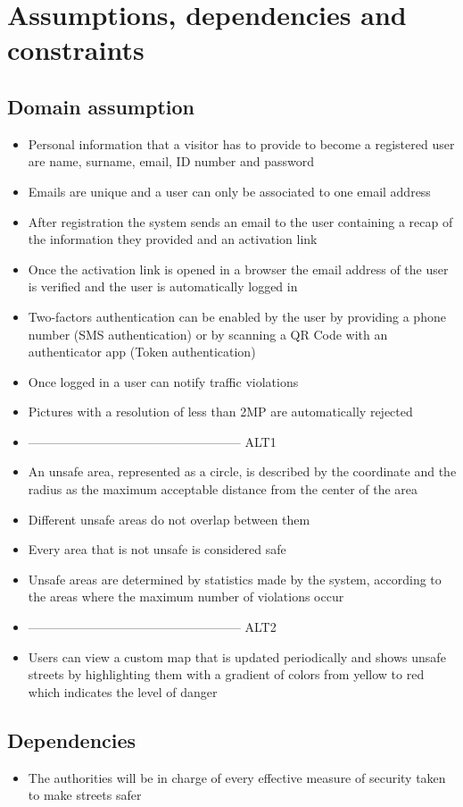 \section{Assumptions, dependencies and constraints}

\subsection{Domain assumption}
  \begin{itemize}
    \item Personal information that a visitor has to provide to become a registered user are name, surname, email, ID number and password
    \item Emails are unique and a user can only be associated to one email address
    \item After registration the system sends an email to the user containing a recap of the information they provided and an activation link
    \item Once the activation link is opened in a browser the email address of the user is verified and the user is automatically logged in
    \item Two-factors authentication can be enabled by the user by providing a phone number (SMS authentication) or by scanning a QR Code with an authenticator app (Token authentication)
    \item Once logged in a user can notify traffic violations
    \item Pictures with a resolution of less than 2MP are automatically rejected
    \item --------------------------------------------------- ALT1
    \item An unsafe area, represented as a circle, is described by the coordinate and
    the radius as the maximum acceptable distance from the center of the area
    \item Different unsafe areas do not overlap between them
    \item Every area that is not unsafe is considered safe
    \item Unsafe areas are determined by statistics made by the system, according to the areas where the maximum number of violations occur 
    \item --------------------------------------------------- ALT2
    \item Users can view a custom map that is updated periodically and shows unsafe streets by highlighting them with a gradient of colors from yellow to red which indicates the level of danger
  \end{itemize}

\subsection{Dependencies}
  \begin{itemize}
    \item The authorities will be in charge of every effective measure of security taken to make streets safer
  \end{itemize}
